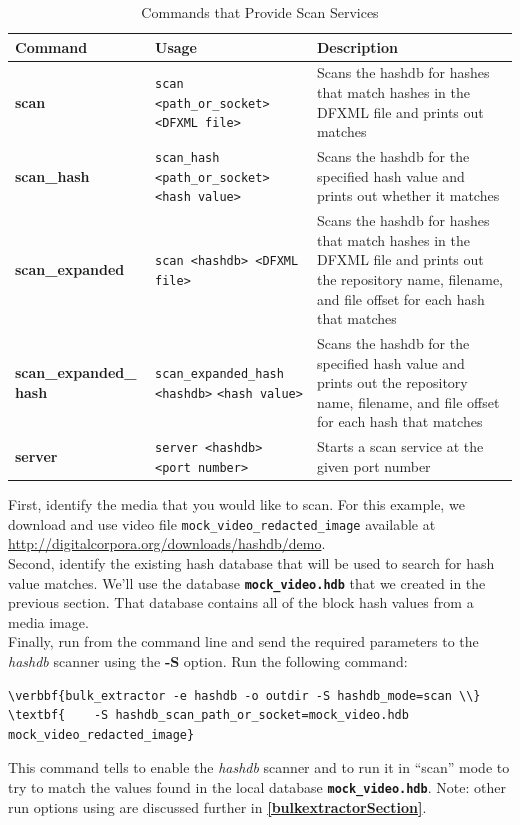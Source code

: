 \documentclass[11pt,fleqn]{article} %
\begin{document}
\begin{table}[!ht]
\centering
\caption{Commands that Provide Scan Services}
\label{tab:scanServices}
\begin{tabular}{|p{3.5 cm}|p{6 cm}|p{4 cm}|}
\hline \hline
\textbf{Command} & \textbf{Usage} & \textbf{Description} \\
\hline
\textbf{scan} & \verb+scan <path_or_socket>+ \verb+<DFXML file>+ & Scans the hashdb for hashes that match hashes in the DFXML file and prints out matches\\
\hline
\textbf{scan\_hash} & \verb+scan_hash <path_or_socket>+ \verb+<hash value>+ & Scans the hashdb for the specified hash value and prints out whether it matches\\
\hline
\textbf{scan\_expanded} & \verb+scan <hashdb> <DFXML file>+ & Scans the hashdb for hashes that match hashes in the DFXML file and prints out the repository name, filename, and file offset for each hash that matches\\
\hline
\textbf{scan\_expanded\_} \textbf{hash} & \verb+scan_expanded_hash <hashdb>+ \verb+<hash value>+ & Scans the hashdb for the specified hash value and prints out the repository name, filename, and file offset for each hash that matches\\
\hline
\textbf{server} &  \verb+server <hashdb> <port number>+ & Starts a scan service at the given port number\\
\hline
\end{tabular}
\end{table}

First, identify the media that you would like to scan. For this example, we download and use video file \texttt{mock\_video\_redacted\_image} available at \url{http://digitalcorpora.org/downloads/hashdb/demo}.\\ 

Second, identify the existing hash database that will be used to search for hash value matches. We'll use the database \texttt{\textbf{mock\_video.hdb}} that we created in the previous section. That database contains all of the block hash values from a media image. \\

Finally, run \bulk from the command line and send the required parameters to the \textit{hashdb} scanner using the \textbf{-S} option. Run the following command: 
\begin{Verbatim}[commandchars=\\\{\}]
\verbbf{bulk_extractor -e hashdb -o outdir -S hashdb_mode=scan \\}
\textbf{    -S hashdb_scan_path_or_socket=mock_video.hdb mock_video_redacted_image}
\end{Verbatim}
This command tells \bulk to enable the \textit{hashdb} scanner and to run it in ``scan'' mode to try to match the values found in the local database \texttt{\textbf{mock\_video.hdb}}. Note: other run options using \bulk are discussed further in \textbf{\autoref{bulkextractorSection}}.\\
\end{document}
